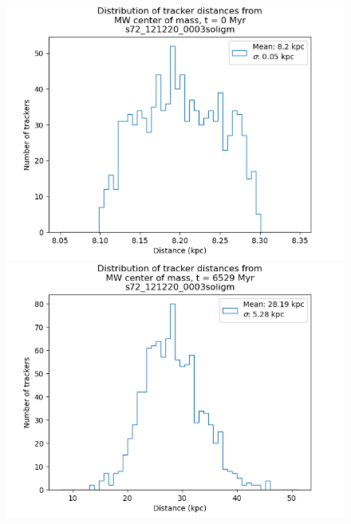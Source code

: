 \documentclass[a4paper,12pt, english]{article}
\begin{document}
\begin{figure}[!h]
\centering
\begin{minipage}{0.45\textwidth}
  \centering
\includegraphics[width=1\textwidth]{Histogram/IGMvelfactor1/hist_mw_com_00000.png}
\end{minipage}
\begin{minipage}{0.45\textwidth}
  \centering
\includegraphics[width=1\textwidth]{Histogram/IGMvelfactor1/hist_mw_com_01306.png}
\end{minipage}
\begin{minipage}{0.45\textwidth}
  \centering

\end{minipage}
\end{figure}
\end{document}
